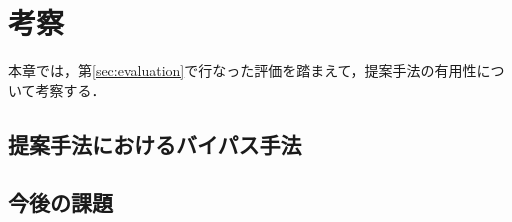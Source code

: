 \section{考察}
本章では，第\ref{sec:evaluation}で行なった評価を踏まえて，提案手法の有用性について考察する．
% 
\subsection{提案手法におけるバイパス手法}
\subsection{今後の課題}


